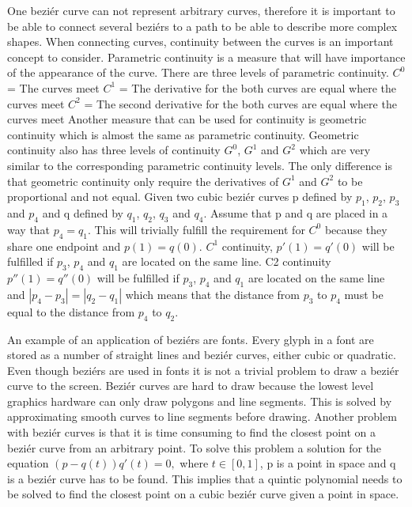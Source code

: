 One beziér curve can not represent arbitrary curves, therefore it is important to be able to connect several beziérs to a path to be able to describe more complex shapes. When connecting curves, continuity between the curves is an important concept to consider. Parametric continuity is a measure that will have importance of the appearance of the curve. There are three levels of parametric continuity.\vspace{\baselineskip}\newline
\begin{math}C^0\end{math} = The curves meet\newline
\begin{math}C^1\end{math} = The derivative for the both curves are equal where the curves meet\newline
\begin{math}C^2\end{math} = The second derivative for the both curves are equal where the curves meet\vspace{\baselineskip} \newline
Another measure that can be used for continuity is geometric continuity which is almost the same as parametric continuity. Geometric continuity also has three levels of continuity $G^0$, $G^1$ and $G^2$ which are very similar to the corresponding parametric continuity levels. The only difference is that geometric continuity only require the derivatives of $G^1$ and $G^2$ to be proportional and not equal. Given two cubic beziér curves p defined by $p_1$, $p_2$, $p_3$ and $p_4$ and q defined by $q_1$, $q_2$, $q_3$ and $q_4$. Assume that p and q are placed in a way that $p_4=q_1$. This will trivially fulfill the requirement for $C^0$ because they share one endpoint and $p(1)=q(0)$. $C^1$ continuity, $p'(1)=q'(0)$ will be fulfilled if $p_3$, $p_4$ and $q_1$ are located on the same line. C2 continuity $p''(1)=q''(0)$ will be fulfilled if  $p_3$, $p_4$ and $q_1$ are located on the same line and $|p_4 - p_3| = |q_2 - q_1|$ which means that the distance from $p_3$ to $p_4$ must be equal to the distance from $p_4$ to $q_2$.\citep{PFNP}

An example of an application of beziérs are fonts. Every glyph in a font are stored as a number of straight lines and beziér curves, either cubic or quadratic.\citep{phinney2001} Even though beziérs are used in fonts it is not a trivial problem to draw a beziér curve to the screen. Beziér curves are hard to draw because the lowest level graphics hardware can only draw polygons and line segments. This is solved by approximating smooth curves to line segments before drawing\citep{shreiner2009opengl}. Another problem with beziér curves is that it is time consuming to find the closest point on a beziér curve from an arbitrary point. To solve this problem a solution for the equation $(p-q(t))q'(t)=0,$ where $t\in[0, 1] $, p is a point in space and q is a beziér curve has to be found\citep{xiaodiao}. This implies that a quintic polynomial needs to be solved to find the closest point on a cubic beziér curve given a point in space. 


